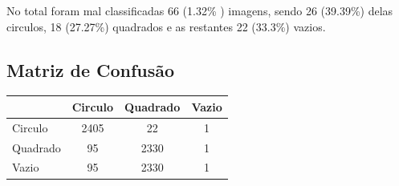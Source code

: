 No total foram mal classificadas 66 (1.32\% ) imagens, sendo 26 (39.39\%) delas circulos, 18 (27.27\%) quadrados e as restantes 22 (33.3\%) vazios. 

\subsection{Matriz de Confusão}

\begin{table}[H]
\centering
\begin{tabular}{l|c c c}
                 & Circulo & Quadrado & Vazio \\
\hline
Circulo          & 2405         & 22     & 1           \\
Quadrado         & 95           & 2330   & 1           \\
Vazio            & 95           & 2330   & 1           \\
\end{tabular}
\end{table}